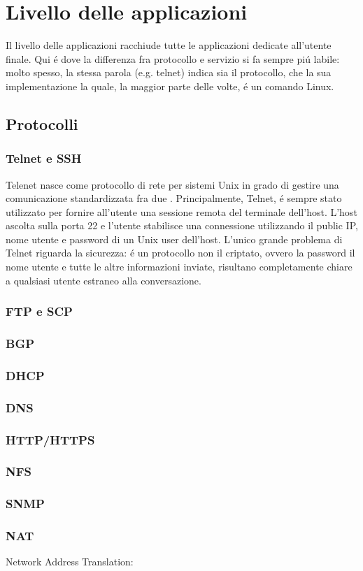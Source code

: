 \documentclass[a4paper,11pt]{article}
\def\sec#1{\section{#1}\label{#1}}
\def\subsub#1{\subsubsection{#1}\label{#1}}
\def\vedi#1{\nameref{#1}}
\begin{document}
\sec{Livello delle applicazioni}
Il livello delle applicazioni racchiude tutte le applicazioni dedicate all'utente finale. 
Qui \'e dove la differenza fra protocollo e servizio si fa sempre pi\'u labile: molto spesso, la stessa parola (e.g. telnet) indica sia il protocollo, che la sua implementazione la quale, la maggior parte delle volte, \'e un comando Linux. 
\subsection{Protocolli}
\subsub{Telnet e SSH} %
Telenet nasce come protocollo di rete per sistemi Unix in grado di gestire una comunicazione standardizzata fra due \vedi{DTE}. Principalmente, Telnet, \'e sempre stato utilizzato per fornire all'utente una sessione remota del terminale dell'host. L'host ascolta sulla porta 22 e l'utente stabilisce una connessione utilizzando il public IP, nome utente e password di un Unix user dell'host. L'unico grande problema di Telnet riguarda la sicurezza: \'e un protocollo non il criptato, ovvero la password il nome utente e tutte le altre informazioni inviate, risultano completamente chiare a qualsiasi utente estraneo alla conversazione.
\subsub{FTP e SCP} %
\subsub{BGP} 
\subsub{DHCP} %
\subsub{DNS} 
\subsub{HTTP/HTTPS} 
\subsub{NFS}
\subsub{SNMP} %
\subsub{NAT}
Network Address Translation:
\end{document}
